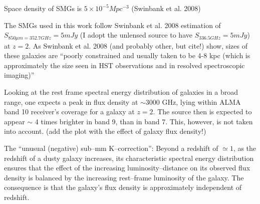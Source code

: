 \documentclass[paper=a4, fontsize=11pt]{scrartcl} %
\numberwithin{equation}{section} %
\numberwithin{figure}{section} %
\numberwithin{table}{section} %
\begin{document}
Space density of SMGs is $5\times 10^{-5} Mpc^{-3}$ (Swinbank et al. 2008)

The SMGs used in this work follow Swinbank et al. 2008 estimation of $S_{850\mu m = 352.7 GHz} = 5 mJy$ (I adopt the unlensed source to have $S_{336.5 GHz} = 5 mJy$) at $z=2$. As Swinbank et al. 2008 (and probably other, but cite!) show, sizes of these galaxies are ``poorly constrained and usually taken to be 4-8 kpc (which is approximately the size seen in HST observations and in resolved spectroscopic imaging)'' 

Looking at the rest frame spectral energy distribution of galaxies in a broad range, one expects a peak in flux density at $\sim$3000 GHz, lying within ALMA band 10 receiver's coverage for a galaxy at $z=2$. The source then is expected to appear $\sim$ 4 times brighter in band 9, than in band 7. This, however, is not taken into account. (add the plot with the effect of galaxy flux density!)

The ``unusual (negative) sub--mm K--correction'': Beyond a redshift of $\simeq 1$, as the redshift of a dusty galaxy increases, its characteristic spectral energy distribution ensures that the effect of the increasing luminosity--distance on its observed flux density is balanced by the increasing rest--frame luminosity of the galaxy. The consequence is that the galaxy's flux density is approximately independent of redshift.


\end{document}
